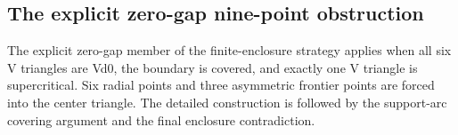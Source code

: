 \subsection{The explicit zero-gap nine-point obstruction}
\label{subsec:nine-point}

The explicit zero-gap member of the finite-enclosure strategy applies when all six V triangles are Vd0, the
boundary is covered, and exactly one V triangle is supercritical.  Six
radial points and three asymmetric frontier points are forced into the center
triangle.  The detailed construction is followed by the support-arc covering
argument and the final enclosure contradiction.

\begingroup
\let\section\subsubsection
\let\subsection\paragraph
\let\subsubsection\paragraph

\endgroup

\begingroup
\let\subsection\subsubsection
\let\subsubsection\paragraph

\endgroup
